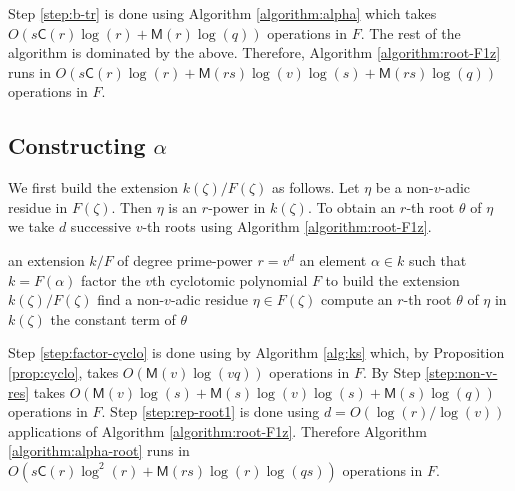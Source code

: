 \documentclass[12pt]{article}
\theoremstyle{plain}
\theoremstyle{definition}
\def\MM{\ensuremath{\mathsf{M}}}
\def\CC{\ensuremath{\mathsf{C}}}
\newcounter{algorithm}
\begin{document}
Step \ref{step:b-tr} is done using Algorithm \ref{algorithm:alpha} which takes $O(s\CC(r)\log(r) + 
\MM(r)\log(q))$ operations in $F$. The rest of the algorithm is dominated by the above. Therefore, 
Algorithm \ref{algorithm:root-F1z} runs in $O(s\CC(r)\log(r) + \MM(rs)\log(v)\log(s) + 
\MM(rs)\log(q))$ operations in $F$. 




\subsection{Constructing $\alpha$}

We first build the extension $k(\zeta) / F(\zeta)$ as follows. Let $\eta$ be a 
non-$v$-adic residue in $F(\zeta)$. Then $\eta$ is an $r$-power in $k(\zeta)$. To obtain an 
$r$-th root $\theta$ of $\eta$ we take $d$ successive $v$-th roots using Algorithm 
\ref{algorithm:root-F1z}. 

\begin{algorithm}
	[Find $\alpha \in k$ such that $k = F(\alpha)$]
	\label{algorithm:alpha-root}
	\begin{algorithmic}[1]
		\REQUIRE an extension $k / F$ of degree prime-power $r = v^d$
		\ENSURE an element $\alpha \in k$ such that $k = F(\alpha)$
		\STATE\label{step:factor-cyclo} factor the $v$th cyclotomic polynomial $F$ to 
		build the extension $k(\zeta) / F(\zeta)$
		\STATE\label{step:non-v-res} find a non-$v$-adic residue $\eta \in F(\zeta)$
		\STATE\label{step:rep-root1} compute an $r$-th root $\theta$ of $\eta$ in $k(\zeta)$
		\RETURN the constant term of $\theta$
	\end{algorithmic}
\end{algorithm}

Step \ref{step:factor-cyclo} is done using by Algorithm \ref{alg:ks} which, by Proposition 
\ref{prop:cyclo}, takes $O(\MM(v)\log(vq))$ operations in $F$. By \cite[Lemma 15]{shoup94} Step 
\ref{step:non-v-res} takes $O(\MM(v)\log(s) + \MM(s)\log(v)\log(s) + \MM(s)\log(q))$ operations in 
$F$. Step \ref{step:rep-root1} is done using $d = O(\log(r) / \log(v))$ applications of Algorithm 
\ref{algorithm:root-F1z}. Therefore Algorithm \ref{algorithm:alpha-root} runs in 
$O(s\CC(r)\log^2(r) + \MM(rs)\log(r)\log(qs))$ operations in $F$. 







\end{document}
